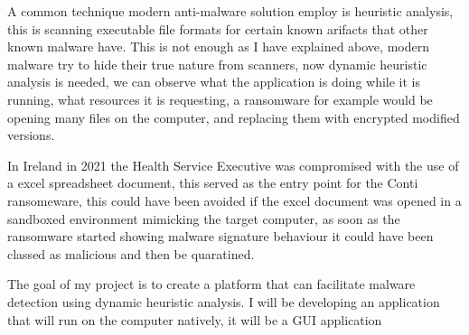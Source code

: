 A common technique modern anti-malware solution employ is heuristic analysis,
this is scanning executable file formats for certain known arifacts that other known malware have.
This is not enough as I have explained above, modern malware try to hide their true nature from scanners,
now dynamic heuristic analysis is needed, we can observe what the application is doing while it is running, what resources it is requesting,
a ransomware for example would be opening many files on the computer, and replacing them with encrypted modified versions.

In Ireland in 2021 the Health Service Executive was compromised with the use of a excel spreadsheet document,
this served as the entry point for the Conti ransomeware, this could have been avoided if the excel document was opened in a sandboxed environment mimicking the target computer,
as soon as the ransomware started showing malware signature behaviour it could have been classed as malicious and then be quaratined.

The goal of my project is to create a platform that can facilitate malware detection using dynamic heuristic analysis.
I will be developing an application that will run on the computer natively, it will be a GUI application

